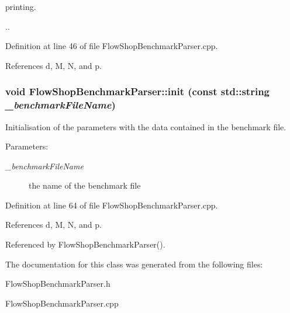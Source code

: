 printing. 

.. 

Definition at line 46 of file Flow\-Shop\-Benchmark\-Parser.cpp.

References d, M, N, and p.
\subsubsection{\setlength{\rightskip}{0pt plus 5cm}void Flow\-Shop\-Benchmark\-Parser::init (const std::string {\em \_\-benchmark\-File\-Name})\hspace{0.3cm}{\tt  [private]}}\label{classFlowShopBenchmarkParser_4e6de6a0ec2859e1a2fb758fb06dc915}


Initialisation of the parameters with the data contained in the benchmark file. 

\begin{Desc}
\item[Parameters:]
\begin{description}
\item[{\em \_\-benchmark\-File\-Name}]the name of the benchmark file \end{description}
\end{Desc}


Definition at line 64 of file Flow\-Shop\-Benchmark\-Parser.cpp.

References d, M, N, and p.

Referenced by Flow\-Shop\-Benchmark\-Parser().

The documentation for this class was generated from the following files:\begin{CompactItemize}
\item 
Flow\-Shop\-Benchmark\-Parser.h\item 
Flow\-Shop\-Benchmark\-Parser.cpp\end{CompactItemize}

